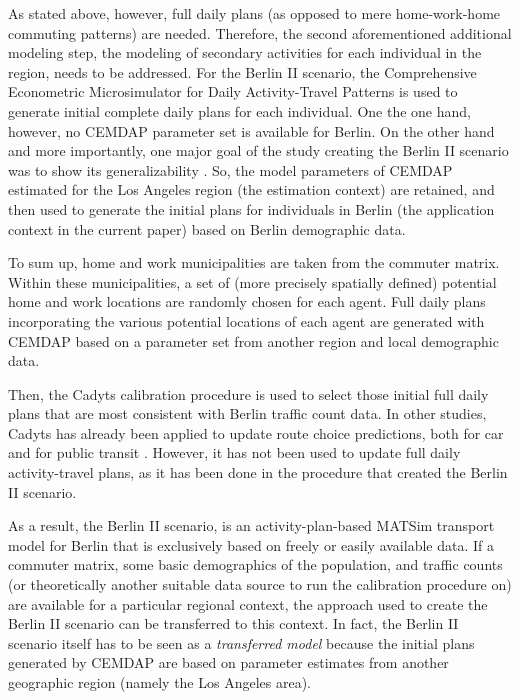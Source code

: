 As stated above, however, full daily plans (as opposed to mere home-work-home commuting patterns) are needed. Therefore, the second aforementioned additional modeling step, the modeling of secondary activities for each individual in the region, needs to be addressed. For the Berlin II scenario, the Comprehensive Econometric Microsimulator for Daily Activity-Travel Patterns \citep{BhatEtAl2008CEMDAPUserManual} is used to generate initial complete daily plans for each individual. One the one hand, however, no CEMDAP parameter set is available for Berlin. On the other hand and more importantly, one major goal of the study creating the Berlin II scenario was to show its generalizability \citep{ ZiemkeNagelBhat2015IntegratingCemdapMatsimTransferabilityTRB}. So, the model parameters of CEMDAP estimated for the Los Angeles region (the estimation context) are retained, and then used to generate the initial plans for individuals in Berlin (the application context in the current paper) based on Berlin demographic data.

To sum up, home and work municipalities are taken from the commuter matrix. Within these municipalities, a set of (more precisely spatially defined) potential home and work locations are randomly chosen for each agent. Full daily plans incorporating the various potential locations of each agent are generated with CEMDAP based on a parameter set from another region and local demographic data.

Then, the Cadyts calibration procedure is used to select those initial full daily plans that are most consistent with Berlin traffic count data. In other studies, Cadyts has already been applied to update route choice predictions, both for car \citep{FloetteroedChenEtAl2011BehavioralCalibAndAna} and for public transit \citep{MoyoNagel2013ptNetCalibrationABMTPO}. However, it has not been used to update full daily activity-travel plans, as it has been done in the procedure that created the Berlin II scenario. 

As a result, the Berlin II scenario, is an activity-plan-based MATSim transport model for Berlin that is exclusively based on freely or easily available data. If a commuter matrix, some basic demographics of the population, and traffic counts (or theoretically another suitable data source to run the calibration procedure on) are available for a particular regional context, the approach used to create the Berlin II scenario can be transferred to this context. In fact, the Berlin II scenario itself has to be seen as a \textit{transferred model} because the initial plans generated by CEMDAP are based on parameter estimates from another geographic region (namely the Los Angeles area).

